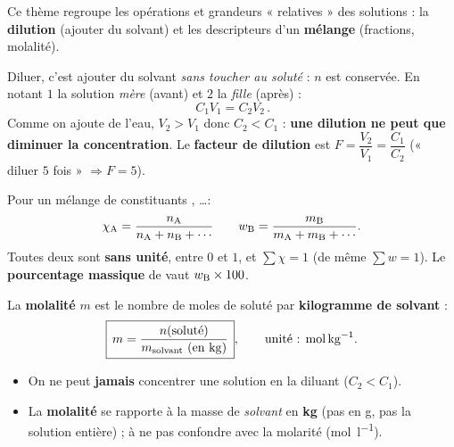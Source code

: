 \documentclass[11pt,a4paper]{article}
\begin{document}
\noindent
Ce thème regroupe les opérations et grandeurs « relatives » des solutions : la \textbf{dilution}
(ajouter du solvant) et les descripteurs d'un \textbf{mélange} (fractions, molalité).

\begin{cle}
Diluer, c'est ajouter du solvant \emph{sans toucher au soluté} : $n$ est conservée. En notant $1$ la
solution \emph{mère} (avant) et $2$ la \emph{fille} (après) :
\[ \boxed{\,C_1 V_1 = C_2 V_2\,}. \]
Comme on ajoute de l'eau, $V_2 > V_1$ donc $C_2 < C_1$ : \textbf{une dilution ne peut que diminuer la
concentration}. Le \textbf{facteur de dilution} est $F = \dfrac{V_2}{V_1} = \dfrac{C_1}{C_2}$
(« diluer $5$ fois » $\Rightarrow F=5$).
\end{cle}

\begin{center}
\end{center}

\begin{cle}
Pour un mélange de constituants , \ldots :
\[ \chi_{\ce{A}} = \dfrac{n_{\ce{A}}}{n_{\ce{A}}+n_{\ce{B}}+\cdots}\qquad
   w_{\ce{B}} = \dfrac{m_{\ce{B}}}{m_{\ce{A}}+m_{\ce{B}}+\cdots}. \]
Toutes deux sont \textbf{sans unité}, entre $0$ et $1$, et $\sum\chi = 1$ (de même $\sum w = 1$).
Le \textbf{pourcentage massique} de  vaut $w_{\ce{B}}\times 100$.
\end{cle}

\begin{cle}[molalité]
La \textbf{molalité} $m$ est le nombre de moles de soluté par \textbf{kilogramme de solvant} :
\[ \boxed{\,m = \dfrac{n(\text{soluté})}{m_{\text{solvant}}\ (\text{en \si{\kilo\gram}})}\,},\qquad
   \text{unité : }\si{\mole\per\kilo\gram}. \]
\end{cle}

\begin{piege}
\begin{itemize}[leftmargin=1.4em,topsep=1pt,itemsep=1pt]
  \item On ne peut \textbf{jamais} concentrer une solution en la diluant ($C_2 < C_1$).
  \item La \textbf{molalité} se rapporte à la masse de \emph{solvant} en \textbf{kg} (pas en g, pas la
        solution entière) ; à ne pas confondre avec la molarité (\si{\mole\per\litre}).
\end{itemize}
\end{piege}
\end{document}
